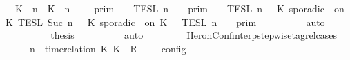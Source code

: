 \begin{isabellebody}
\ {\isacartoucheopen}{\isasymlbrakk}{\isasymlbrakk}\ {\isacharparenleft}{\isacharparenleft}K\ {\isasymUp}\ n{\isacharparenright}\ {\isacharhash}\ {\isacharparenleft}K\ {\isasymDown}\ n\ {\isacharat}\ {\isasymtau}{\isacharparenright}\ {\isacharhash}\ {\isasymGamma}{\isacharparenright}\ {\isasymrbrakk}{\isasymrbrakk}\isactrlsub p\isactrlsub r\isactrlsub i\isactrlsub m\ {\isasyminter}\ {\isasymlbrakk}{\isasymlbrakk}\ {\isasymPsi}\ {\isasymrbrakk}{\isasymrbrakk}\isactrlsub T\isactrlsub E\isactrlsub S\isactrlsub L\isactrlbsup {\isasymge}\ n\isactrlesup \ {\isasymunion}\ {\isasymlbrakk}{\isasymlbrakk}\ {\isasymGamma}\ {\isasymrbrakk}{\isasymrbrakk}\isactrlsub p\isactrlsub r\isactrlsub i\isactrlsub m\ {\isasyminter}\ {\isasymlbrakk}{\isasymlbrakk}\ {\isasymPsi}\ {\isasymrbrakk}{\isasymrbrakk}\isactrlsub T\isactrlsub E\isactrlsub S\isactrlsub L\isactrlbsup {\isasymge}\ n\isactrlesup \ {\isasyminter}\ {\isasymlbrakk}\ K\ sporadic\ {\isasymtau}\ on\ K\ {\isasymrbrakk}\isactrlsub T\isactrlsub E\isactrlsub S\isactrlsub L\isactrlbsup {\isasymge}\ Suc\ n\isactrlesup \ {\isacharequal}\ {\isasymlbrakk}{\isasymlbrakk}\ {\isacharparenleft}K\ sporadic\ {\isasymtau}\ on\ K\ {\isacharhash}\ {\isasymPsi}\ {\isasymrbrakk}{\isasymrbrakk}\isactrlsub T\isactrlsub E\isactrlsub S\isactrlsub L\isactrlbsup {\isasymge}\ n\isactrlesup \ {\isasyminter}\ {\isasymlbrakk}{\isasymlbrakk}\ {\isasymGamma}\ {\isasymrbrakk}{\isasymrbrakk}\isactrlsub p\isactrlsub r\isactrlsub i\isactrlsub m{\isacartoucheclose}\isanewline
\ \ \ \ \ \ \ \ \isamarkupfalse%
\ auto\isanewline
\ \ \ \ \ \ \isamarkupfalse%
\ \isamarkupfalse%
\ {\isacharquery}thesis\isanewline
\ \ \ \ \ \ \ \ \isamarkupfalse%
\ auto\isanewline
\ \ \ \ \isamarkupfalse%
\isanewline
\ \ \isamarkupfalse%
%
\endisatagproof
{\isafoldproof}%
%
\isadelimproof
\isanewline
%
\endisadelimproof
\isanewline
{}\isamarkupfalse%
\ HeronConf{\isacharunderscore}interp{\isacharunderscore}stepwise{\isacharunderscore}tagrel{\isacharunderscore}cases{\isacharcolon}\isanewline
\ \ \ {\isacartoucheopen}{\isasymlbrakk}\ {\isasymGamma}{\isacharcomma}\ n\ {\isasymturnstile}\ {\isacharparenleft}{\isacharparenleft}time{\isacharminus}relation\ {\isasymlfloor}K\ K\ {\isasymin}\ R{\isacharparenright}\ {\isacharhash}\ {\isasymPsi}{\isacharparenright}\ {\isasymtriangleright}\ {\isasymPhi}\ {\isasymrbrakk}\isactrlsub c\isactrlsub o\isactrlsub n\isactrlsub f\isactrlsub i\isactrlsub g\isanewline

\end{isabellebody}
